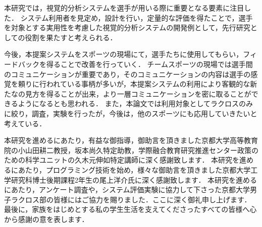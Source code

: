 \documentclass[sotsuron]{kuee}
\begin{document}
	本研究では，視覚的分析システムを選手が用いる際に重要となる要素に注目した．
	システム利用者を見定め，設計を行い，定量的な評価を得たことで，選手を対象とする実用性を考慮した視覚的分析システムの開発例として，先行研究としての役割を果たすと考えられる．

	今後，本提案システムをスポーツの現場にて，選手たちに使用してもらい，フィードバックを得ることで改善を行っていく．
	チームスポーツの現場では選手間のコミュニケーションが重要であり，そのコミュニケーションの内容は選手の感覚を頼りに行われている事柄が多いが，本提案システムの利用により客観的な新たなの見方を得ることが出来，より一層コミュニケーションを密に取ることができるようになるとも思われる．
	また，本論文では利用対象としてラクロスのみに絞り，調査，実験を行ったが，今後は，他のスポーツにも応用していきたいと考えている．



\begin{acknowledgements}
	本研究を進めるにあたり，有益な御指導，御助言を頂きました京都大学高等教育院の小山田耕二教授，坂本尚久特定助教，学際融合教育研究推進センター政策のための科学ユニットの久木元伸如特定講師に深く感謝致します．
	本研究を進めるにあたり，プログラミング技術を始め，様々な御助言を頂きました京都大学工学研究科博士後期課程2年生の尾上洋介氏に深く感謝致します．
	本研究を進めるにあたり，アンケート調査や，システム評価実験に協力して下さった京都大学男子ラクロス部の皆様にはご協力を賜りました．ここに深く御礼申し上げます．
	最後に，家族をはじめとする私の学生生活を支えてくださったすべての皆様へ心から感謝の意を表します．
\end{acknowledgements}








\appendix
\end{document}
